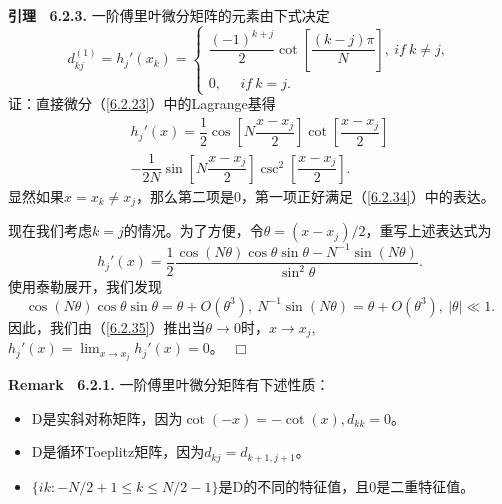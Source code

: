 \textbf{引理 \  6.2.3.}  一阶傅里叶微分矩阵的元素由下式决定
\begin{equation}
    d_{kj}^{(1)} = h_j'(x_k) = 
    \left\{
        \begin{array}{l}
            \dfrac{(-1)^{k+j}}{2} \cot\left[\dfrac{(k-j)\pi}{N}\right], \   if \ k\neq j, \\
            0, \ \ \ \ \ \ if \ k = j.     
        \end{array}
    \right.
    \label{6.2.34}
\end{equation}    
    证：直接微分（\ref{6.2.23}）中的Lagrange基得    
\begin{equation*}
\begin{gathered}
    h_j'(x) = \dfrac{1}{2} \cos\left[N\dfrac{x - x_j}{2}\right] \cot\left[\dfrac{x - x_j}{2}\right] \\
    - \dfrac{1}{2N} \sin\left[N\dfrac{x - x_j}{2}\right]\csc^2\left[\dfrac{x - x_j}{2}\right].
\end{gathered}    
\end{equation*}    
    显然如果$x = x_k\neq x_j$，那么第二项是0，第一项正好满足（\ref{6.2.34}）中的表达。
    
    现在我们考虑$k = j$的情况。为了方便，令$\theta = (x - x_j)/2$，重写上述表达式为    
\begin{equation}
    h_j'(x) = \dfrac{1}{2} \dfrac{\cos(N\theta)\cos\theta\sin\theta - N^{-1}\sin(N\theta)}{\sin^2\theta}.
    \label{6.2.35}
\end{equation}    
    使用泰勒展开，我们发现    
\begin{equation*}
    \cos(N\theta)\cos\theta\sin\theta = \theta + O(\theta^3) , \ N^{-1}\sin(N\theta) = \theta + O(\theta^3),\ |\theta| \ll 1.
\end{equation*}        
    因此，我们由（\ref{6.2.35}）推出当$\theta\to 0$时，$x\to x_j$,$h_j'(x) = \lim_{x\to x_j}h_j'(x) = 0$。  $\  \Box$
    
\textbf{Remark \ 6.2.1.}  一阶傅里叶微分矩阵有下述性质：
\begin{itemize}
    \item  D是实斜对称矩阵，因为$\cot(-x) = -\cot(x),d_{kk} = 0$。
    \item  D是循环Toeplitz矩阵，因为$d_{kj} = d_{k+1,j+1}$。
    \item  $\{ ik : -N/2 + 1\leq k\leq N/2 - 1 \}$是D的不同的特征值，且0是二重特征值。
\end{itemize}

